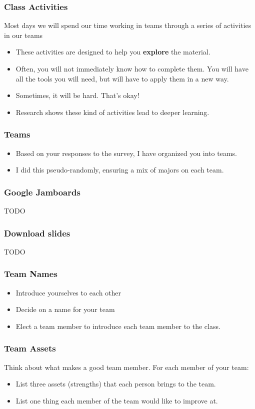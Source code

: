 \documentclass[aspectration=1610]{beamer}
\begin{document}
  
\begin{frame}\frametitle{Class Activities}
Most days we will spend our time working in teams through a series of activities in our teams
\begin{itemize}
\item These activities are designed to help you \textbf{explore} the material.
\item Often, you will not immediately know how to complete them.  You will have all the tools you will need, but will have to apply them in a new way.
\item Sometimes, it will be hard.  That's okay!
\item Research shows these kind of activities lead to deeper learning.
\end{itemize}

\end{frame}

\begin{frame}\frametitle{Teams}
\begin{itemize}
\item Based on your responses to the survey, I have organized you into teams.
\item I did this pseudo-randomly, ensuring a mix of majors on each team.
\end{itemize}
\end{frame}

\begin{frame}\frametitle{Google Jamboards}
TODO
\end{frame}

\begin{frame}\frametitle{Download slides}
TODO
\end{frame}

\begin{frame}\frametitle{Team Names}
\begin{itemize}
\item Introduce yourselves to each other
\item Decide on a name for your team
\item Elect a team member to introduce each team member to the class.

\end{itemize}
\end{frame}

\begin{frame}\frametitle{Team Assets}
Think about what makes a good team member.  For each member of your team:

\begin{itemize}
\item List three assets (strengths) that each person brings to the team.
\pause \item List one thing each member of the team would like to improve at.
\end{itemize}
\end{frame}
\end{document}
